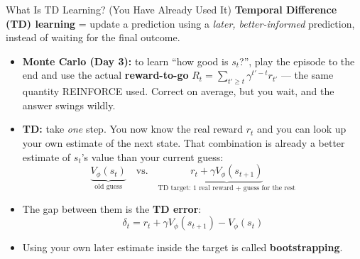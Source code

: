 \begin{frame}{What Is TD Learning? (You Have Already Used It)}
\textbf{Temporal Difference (TD) learning} = update a prediction using a \emph{later, better-informed} prediction, instead of waiting for the final outcome.
\vspace{0.4em}
\begin{itemize}
    \item \textbf{Monte Carlo (Day 3):} to learn ``how good is $s_t$?'', play the episode to the end and use the actual \textbf{reward-to-go} $R_t = \sum_{t' \geq t} \gamma^{t'-t} r_{t'}$ --- the same quantity REINFORCE used. Correct on average, but you wait, and the answer swings wildly.
    \item \textbf{TD:} take \emph{one} step. You now know the real reward $r_t$ and you can look up your own estimate of the next state. That combination is already a better estimate of $s_t$'s value than your current guess:
    $$\underbrace{V_\phi(s_t)}_{\text{old guess}} \quad\text{vs.}\quad \underbrace{r_t + \gamma V_\phi(s_{t+1})}_{\text{TD target: 1 real reward + guess for the rest}}$$
    \item The gap between them is the \textbf{TD error}:
    $$\delta_t = r_t + \gamma V_\phi(s_{t+1}) - V_\phi(s_t)$$
    \item Using your own later estimate inside the target is called \textbf{bootstrapping}.
\end{itemize}
\end{frame}

